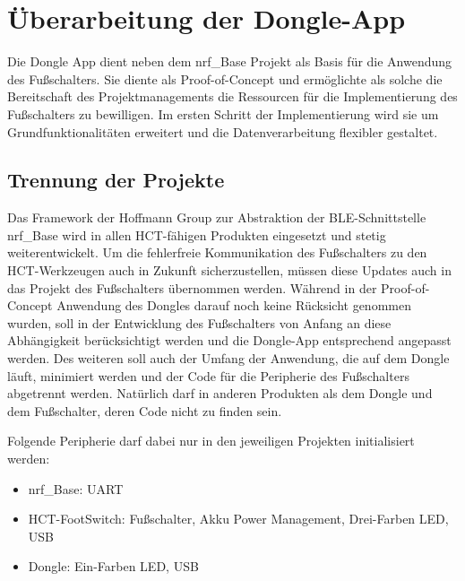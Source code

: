 \section{Überarbeitung der Dongle-App}
Die Dongle App dient neben dem nrf\_Base Projekt als Basis für die Anwendung des Fußschalters. Sie diente als Proof-of-Concept und ermöglichte als solche die Bereitschaft des Projektmanagements die Ressourcen für die Implementierung des Fußschalters zu bewilligen. Im ersten Schritt der Implementierung wird sie um Grundfunktionalitäten erweitert und die Datenverarbeitung flexibler gestaltet.

\subsection{Trennung der Projekte}
Das Framework der Hoffmann Group zur Abstraktion der BLE-Schnittstelle nrf\_Base wird in allen HCT-fähigen Produkten eingesetzt und stetig weiterentwickelt. Um die fehlerfreie Kommunikation des Fußschalters zu den HCT-Werkzeugen auch in Zukunft sicherzustellen, müssen diese Updates auch in das Projekt des Fußschalters übernommen werden. Während in der Proof-of-Concept Anwendung des Dongles darauf noch keine Rücksicht genommen wurden, soll in der Entwicklung des Fußschalters von Anfang an diese Abhängigkeit berücksichtigt werden und die Dongle-App entsprechend angepasst werden. Des weiteren soll auch der Umfang der Anwendung, die auf dem Dongle läuft, minimiert werden und der Code für die Peripherie des Fußschalters abgetrennt werden. Natürlich darf in anderen Produkten als dem Dongle und dem Fußschalter, deren Code nicht zu finden sein.

Folgende Peripherie darf dabei nur in den jeweiligen Projekten initialisiert werden:
\begin{itemize}
	\item nrf\_Base: UART
	\item HCT-FootSwitch: Fußschalter, Akku Power Management, Drei-Farben LED, USB
	\item Dongle: Ein-Farben LED, USB
\end{itemize}

